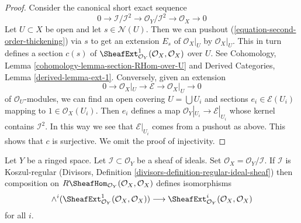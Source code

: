 \begin{proof}
Consider the canonical short exact sequence
\begin{equation}
\label{equation-second-order-thickening}
0 \to \mathcal{I}/\mathcal{I}^2 \to \mathcal{O}_Y/\mathcal{I}^2 \to
\mathcal{O}_X \to 0
\end{equation}
Let $U \subset X$ be open and let $s \in \mathcal{N}(U)$. Then we can
pushout (\ref{equation-second-order-thickening}) via $s$ to
get an extension $E_s$ of $\mathcal{O}_X|_U$ by $\mathcal{O}_X|_U$.
This in turn defines a section $c(s)$ of
$\SheafExt^1_{\mathcal{O}_Y}(\mathcal{O}_X, \mathcal{O}_X)$
over $U$.
See Cohomology, Lemma \ref{cohomology-lemma-section-RHom-over-U}
and Derived Categories, Lemma \ref{derived-lemma-ext-1}.
Conversely, given an extension
$$
0 \to \mathcal{O}_X|_U \to \mathcal{E} \to \mathcal{O}_X|_U \to 0
$$
of $\mathcal{O}_U$-modules, we can find an open covering
$U = \bigcup U_i$ and sections $e_i \in \mathcal{E}(U_i)$
mapping to $1 \in \mathcal{O}_X(U_i)$. Then $e_i$ defines a map
$\mathcal{O}_Y|_{U_i} \to \mathcal{E}|_{U_i}$ whose kernel
contains $\mathcal{I}^2$. In this way we see that
$\mathcal{E}|_{U_i}$ comes from a pushout as above.
This shows that $c$ is surjective. We omit the proof
of injectivity.
\end{proof}

\begin{lemma}
\label{lemma-regular-ideal-ext}
Let $Y$ be a ringed space. Let $\mathcal{I} \subset \mathcal{O}_Y$
be a sheaf of ideals. Set $\mathcal{O}_X = \mathcal{O}_Y/\mathcal{I}$.
If $\mathcal{I}$ is Koszul-regular
(Divisors, Definition \ref{divisors-definition-regular-ideal-sheaf})
then composition on $R\SheafHom_{\mathcal{O}_Y}(\mathcal{O}_X, \mathcal{O}_X)$
defines isomorphisms
$$
\wedge^i(\SheafExt^1_{\mathcal{O}_Y}(\mathcal{O}_X, \mathcal{O}_X))
\longrightarrow
\SheafExt^i_{\mathcal{O}_Y}(\mathcal{O}_X, \mathcal{O}_X)
$$
for all $i$.
\end{lemma}

